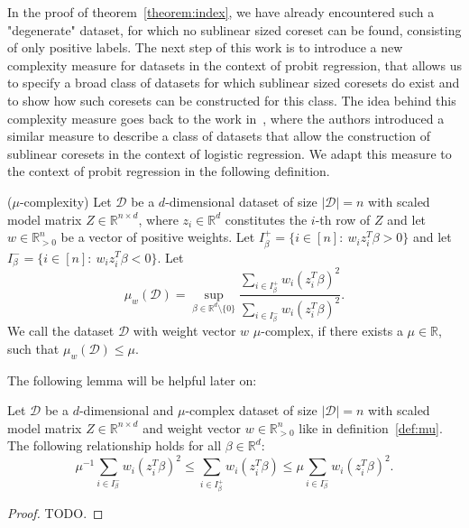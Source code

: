 In the proof of theorem~\ref{theorem:index}, we have already encountered
such a "degenerate" dataset, for which no sublinear sized coreset can be found,
consisting of only positive labels.
The next step of this work is to introduce a new complexity measure
for datasets in the context of probit regression, that allows us
to specify a broad class of datasets for which sublinear sized
coresets do exist and to show how such coresets can be constructed
for this class.
The idea behind this complexity measure goes back to
the work in~\cite{on-coresets}, where the authors introduced a similar
measure to describe a class of datasets that allow the construction
of sublinear coresets in the context of logistic regression.
We adapt this measure to the context of probit regression in the
following definition.

\begin{definition}($\mu$-complexity)
    \label{def:mu}
    Let $\mathcal{D}$ be a $d$-dimensional dataset of size
    $|\mathcal{D}|=n$ with scaled
    model matrix $Z \in \mathbb{R}^{n \times d}$, where
    $z_i \in \mathbb{R}^d$ constitutes the $i$-th
    row of $Z$ and let
    $w \in \mathbb{R}^n_{>0}$ be a vector of positive weights.
    Let $I_\beta^+ = \{i \in [n]:\ w_i z_i^T \beta > 0 \}$
    and let $I_\beta^- = \{i \in [n]:\ w_i z_i^T \beta < 0 \}$.
    Let
    \begin{equation*}
        \mu_w(\mathcal{D}) = \sup_{\beta \in \mathbb{R}^d \setminus \{0\}}
        \frac{\sum_{i \in I_\beta^+} w_i (z_i^T \beta)^2}
        {\sum_{i \in I_\beta^-} w_i (z_i^T \beta)^2}.
    \end{equation*}
    We call the dataset $\mathcal{D}$ with weight vector $w$
    $\mu$-complex, if there exists a $\mu \in \mathbb{R}$,
    such that $\mu_w(\mathcal{D}) \leq \mu$.
\end{definition}

The following lemma will be helpful later on:
\begin{lemma}
    \label{lemma:mu-inequalities}
    Let $\mathcal{D}$ be a $d$-dimensional and $\mu$-complex dataset of size
    $|\mathcal{D}|=n$ with scaled
    model matrix $Z \in \mathbb{R}^{n \times d}$ and weight
    vector $w \in \mathbb{R}^n_{>0}$ like in
    definition~\ref{def:mu}.
    The following relationship holds for all $\beta \in \mathbb{R}^d$:
    \begin{equation*}
        \mu^{-1} \sum_{i \in I_\beta^-} w_i (z_i^T \beta)^2
        \leq \sum_{i \in I_\beta^+} w_i (z_i^T \beta)
        \leq \mu \sum_{i \in I_\beta^-} w_i (z_i^T \beta)^2.
    \end{equation*}
\end{lemma}
\begin{proof}
    TODO.
\end{proof}

